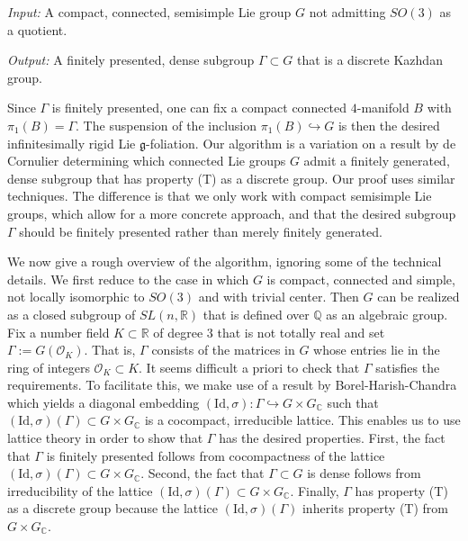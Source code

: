\documentclass[11pt, letterpaper, oneside,reqno]{amsart}
\theoremstyle{plain}
\theoremstyle{underline}
\theoremstyle{definition}
\theoremstyle{remark}
\begin{document}
	\vspace{0.15cm}
	
	\emph{Input:} A compact, connected, semisimple Lie group $G$ not admitting $SO(3)$ as a quotient.
	
	\emph{Output:} A finitely presented, dense subgroup $\Gamma\subset G$ that is a discrete Kazhdan group.
	
	\vspace{0.15cm}
	\noindent 
	Since $\Gamma$ is finitely presented, one can fix a compact connected $4$-manifold $B$ with $\pi_1(B)=\Gamma$. The suspension of the inclusion $\pi_1(B)\hookrightarrow G$ is then the desired infinitesimally rigid Lie $\mathfrak{g}$-foliation. Our algorithm is a variation on a result by de Cornulier \cite{Cornulier} determining which connected Lie groups $G$ admit a finitely generated, dense subgroup that has property (T) as a discrete group. Our proof uses similar techniques. The difference is that we only work with compact semisimple Lie groups, which allow for a more concrete approach, and that the desired subgroup $\Gamma$ should be finitely presented rather than merely finitely generated.
	
	We now give a rough overview of the algorithm, ignoring some of the technical details. We first reduce to the case in which $G$ is compact, connected and simple, not locally isomorphic to $SO(3)$ and with trivial center. Then $G$ can be realized as a closed subgroup of $SL(n,\mathbb{R})$ that is defined over $\mathbb{Q}$ as an algebraic group. Fix a number field $K\subset\mathbb{R}$ of degree $3$ that is not totally real and set $\Gamma:=G(\mathcal{O}_{K})$. That is, $\Gamma$ consists of the matrices in $G$ whose entries lie in the ring of integers $\mathcal{O}_{K}\subset K$. It seems difficult a priori to check that $\Gamma$ satisfies the requirements. To facilitate this, we make use of a result by Borel-Harish-Chandra \cite{harish} which yields a diagonal embedding $(\text{Id},\sigma):\Gamma\hookrightarrow G\times G_{\mathbb{C}}$ such that $(\text{Id},\sigma)(\Gamma)\subset G\times G_{\mathbb{C}}$ is a cocompact, irreducible lattice. This enables us to use lattice theory in order to show that $\Gamma$ has the desired properties. First, the fact that $\Gamma$ is finitely presented follows from cocompactness of the lattice $(\text{Id},\sigma)(\Gamma)\subset G\times G_{\mathbb{C}}$. Second, the fact that $\Gamma\subset G$ is dense follows from irreducibility of the lattice $(\text{Id},\sigma)(\Gamma)\subset G\times G_{\mathbb{C}}$. Finally, $\Gamma$ has property (T) as a discrete group because the lattice $(\text{Id},\sigma)(\Gamma)$ inherits property (T) from $G\times G_{\mathbb{C}}$.
	
\end{document}
